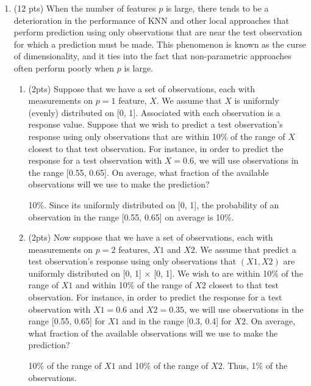 \documentclass[a4paper]{article}
\theoremstyle{definition}
\newenvironment{soln}{
    \leavevmode\color{blue}\ignorespaces
}{}
\begin{document}
\begin{enumerate}
\begin{enumerate}
\end{enumerate}

\item (12 pts) When the number of features $p$ is large, there tends to be a deterioration in the performance of KNN and other local approaches that perform prediction using only observations that are near the test observation for which a prediction must be made. This phenomenon is known as the curse of dimensionality, and it ties into the fact that non-parametric approaches often perform poorly when $p$ is large.

\begin{enumerate}
	\item (2pts) Suppose that we have a set of observations, each with measurements on $p=1$ feature, $X$. We assume that $X$ is uniformly (evenly) distributed on [0, 1]. Associated with each observation is a response value. Suppose that we wish to predict a test observation’s response using only observations that are within 10\% of the range of $X$ closest to that test observation. For instance, in order to predict the response for a test observation with $X=0.6$, we will use observations in the range [0.55, 0.65]. On average, what fraction of the available observations will we use to make the prediction?
	
	\begin{soln} 
		10\%. Since its uniformly distributed on [0, 1], the probability of an observation in the range [0.55, 0.65] on average is 10\%.	\end{soln}
	
	
	\item (2pts) Now suppose that we have a set of observations, each with measurements on $p =2$ features, $X1$ and $X2$. We assume that predict a test observation’s response using only observations that $(X1,X2)$ are uniformly distributed on [0, 1] × [0, 1]. We wish to are within 10\% of the range of $X1$ and within 10\% of the range of $X2$ closest to that test observation. For instance, in order to predict the response for a test observation with $X1 =0.6$ and $X2 =0.35$, we will use observations in the range [0.55, 0.65] for $X1$ and in the range [0.3, 0.4] for $X2$. On average, what fraction of the available observations will we use to make the prediction?
	
	\begin{soln}
		10\% of the range of $X1$ and 10\% of the range of $X2$. Thus, 1\% of the observations.
	\end{soln}
	

\end{enumerate}
\end{enumerate}
\end{document}
